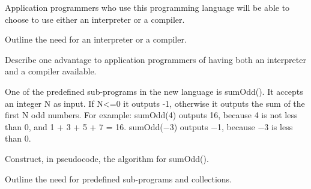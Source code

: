 \begin{exercise*}
Application programmers who use this programming language will be able to choose to use either an interpreter or a compiler.
\begin{parts}
\item Outline the need for an interpreter or a compiler.
\item Describe one advantage to application programmers of having both an interpreter and a compiler available.
\end{parts}
One of the predefined sub-programs in the new language is sumOdd(). It accepts an integer N as input. If N<=0 it outputs -1, otherwise it outputs the sum of the first N odd numbers.
For example:
sumOdd(4) outputs 16, because 4 is not less than 0, and 1 + 3 + 5 + 7 = 16.
sumOdd(−3) outputs −1, because −3 is less than 0.
\begin{parts}
\item Construct, in pseudocode, the algorithm for sumOdd().
\item Outline the need for predefined sub-programs and collections.
\end{parts}
\end{exercise*}


